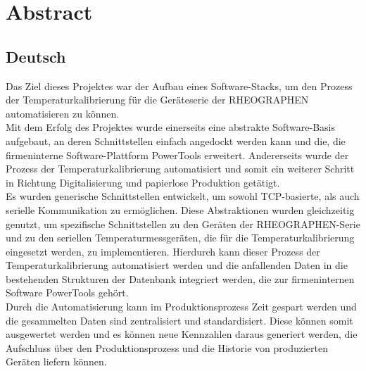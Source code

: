 \chapter{Abstract}

\section{Deutsch}
Das Ziel dieses Projektes war der Aufbau eines Software-Stacks, um den Prozess der Temperaturkalibrierung für die Geräteserie der RHEOGRAPHEN automatisieren zu können.\\
Mit dem Erfolg des Projektes wurde einerseits eine abstrakte Software-Basis aufgebaut, an deren Schnittstellen einfach angedockt werden kann und die, die firmeninterne Software-Plattform PowerTools erweitert. Andererseits wurde der Prozess der Temperaturkalibrierung automatisiert und somit ein weiterer Schritt in Richtung Digitalisierung und papierlose Produktion getätigt.\\
Es wurden generische Schnittstellen entwickelt, um sowohl \ac{TCP}-basierte, als auch serielle Kommunikation zu ermöglichen. Diese Abstraktionen wurden gleichzeitig genutzt, um spezifische Schnittstellen zu den Geräten der RHEOGRAPHEN-Serie und zu den seriellen Temperaturmessgeräten, die für die Temperaturkalibrierung eingesetzt werden, zu implementieren.
Hierdurch kann dieser Prozess der Temperaturkalibrierung automatisiert werden und die anfallenden Daten in die bestehenden Strukturen der Datenbank integriert werden, die zur firmeninternen Software PowerTools gehört.\\
Durch die Automatisierung kann im Produktionsprozess Zeit gespart werden und die gesammelten Daten sind zentralisiert und standardisiert. Diese können somit ausgewertet werden und es können neue Kennzahlen daraus generiert werden, die Aufschluss über den Produktionsprozess und die Historie von produzierten Geräten liefern können.
\clearpage

